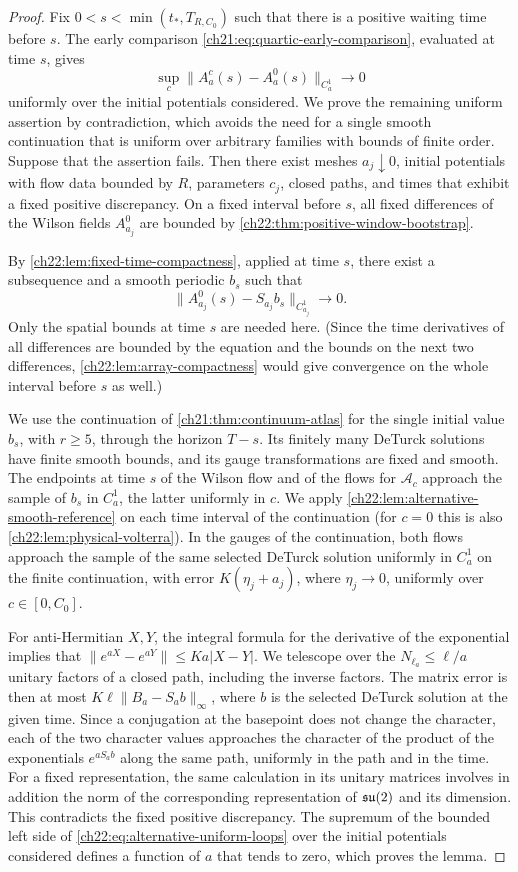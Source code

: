 \begin{proof}
Fix $0<s<\min(t_*,T_{R,C_0})$ such that there is a positive waiting time before $s$. The early comparison \eqref{ch21:eq:quartic-early-comparison}, evaluated at time $s$, gives
\[
 \sup_c\|A_a^c(s)-A_a^0(s)\|_{C_a^1}\longrightarrow0
\]
uniformly over the initial potentials considered. We prove the remaining uniform assertion by contradiction, which avoids the need for a single smooth continuation that is uniform over arbitrary families with bounds of finite order. Suppose that the assertion fails. Then there exist meshes $a_j\downarrow0$, initial potentials with flow data bounded by $R$, parameters $c_j$, closed paths, and times that exhibit a fixed positive discrepancy. On a fixed interval before $s$, all fixed differences of the Wilson fields $A_{a_j}^0$ are bounded by \cref{ch22:thm:positive-window-bootstrap}.

By \cref{ch22:lem:fixed-time-compactness}, applied at time $s$, there exist a subsequence and a smooth periodic $b_s$ such that
\[
 \|A_{a_j}^0(s)-S_{a_j}b_s\|_{C_{a_j}^1}\longrightarrow0 .
\]
Only the spatial bounds at time $s$ are needed here. (Since the time derivatives of all differences are bounded by the equation and the bounds on the next two differences, \cref{ch22:lem:array-compactness} would give convergence on the whole interval before $s$ as well.)

We use the continuation of \cref{ch21:thm:continuum-atlas} for the single initial value $b_s$, with $r\ge5$, through the horizon $T-s$. Its finitely many DeTurck solutions have finite smooth bounds, and its gauge transformations are fixed and smooth. The endpoints at time $s$ of the Wilson flow and of the flows for $\mathcal A_c$ approach the sample of $b_s$ in $C_a^1$, the latter uniformly in $c$. We apply \cref{ch22:lem:alternative-smooth-reference} on each time interval of the continuation (for $c=0$ this is also \cref{ch22:lem:physical-volterra}). In the gauges of the continuation, both flows approach the sample of the same selected DeTurck solution uniformly in $C_a^1$ on the finite continuation, with error $K(\eta_j+a_j)$, where $\eta_j\to0$, uniformly over $c\in[0,C_0]$.

For anti-Hermitian $X,Y$, the integral formula for the derivative of the exponential implies that $\|e^{aX}-e^{aY}\|\le Ka|X-Y|$. We telescope over the $N_{\ell_a}\le\ell/a$ unitary factors of a closed path, including the inverse factors. The matrix error is then at most $K\ell\|B_a-S_ab\|_\infty$, where $b$ is the selected DeTurck solution at the given time. Since a conjugation at the basepoint does not change the character, each of the two character values approaches the character of the product of the exponentials $e^{aS_ab}$ along the same path, uniformly in the path and in the time. For a fixed representation, the same calculation in its unitary matrices involves in addition the norm of the corresponding representation of $\mathfrak{su}(2)$ and its dimension. This contradicts the fixed positive discrepancy. The supremum of the bounded left side of \eqref{ch22:eq:alternative-uniform-loops} over the initial potentials considered defines a function of $a$ that tends to zero, which proves the lemma.
\end{proof}
